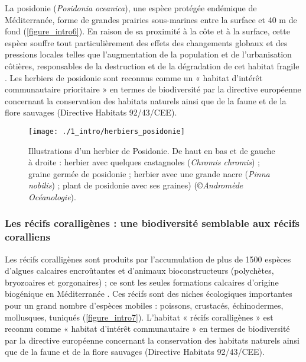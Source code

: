 La posidonie (\textit{Posidonia oceanica}), une espèce protégée endémique de Méditerranée, forme de grandes prairies sous-marines entre la surface et 40 m de fond (\autoref{figure_intro6}). En raison de sa proximité à la côte et à la surface, cette espèce souffre tout particulièrement des effets des changements globaux \citep{marba_mediterranean_2014} et des pressions locales telles que l’augmentation de la population et de l’urbanisation côtières, responsables de la destruction et de la dégradation de cet habitat fragile \citep{montefalcone_human_2010, marba_mediterranean_2014, holon_impact_2015, telesca_seagrass_2015}. Les herbiers de posidonie sont reconnus comme un « habitat d’intérêt communautaire prioritaire » en termes de biodiversité par la directive européenne concernant la conservation des habitats naturels ainsi que de la faune et de la flore sauvages (Directive Habitats 92/43/CEE).

\begin{figure}[H]
	\begin{center}
	\texttt{[image: ./1\_intro/herbiers\_posidonie]}
		\caption[Illustrations d’un herbier de Posidonie]{Illustrations d’un herbier de Posidonie. De haut en bas et de gauche à droite : herbier avec quelques castagnoles (\textit{Chromis chromis}) ; graine germée de posidonie ; herbier avec une grande nacre (\textit{Pinna nobilis}) ; plant de posidonie avec ses graines) (\textit{©Andromède Océanologie}).}
	\label{figure_intro6}
\end{center}
\end{figure}

\subsubsection{Les récifs coralligènes : une biodiversité semblable aux récifs coralliens}\label{intro.1.3.2}

Les récifs coralligènes sont produits par l’accumulation de plus de 1500 espèces d’algues calcaires encroûtantes et d’animaux bioconstructeurs (polychètes, bryozoaires et gorgonaires) \citep{ballesteros_mediterranean_2006}; ce sont les seules formations calcaires d’origine biogénique en Méditerranée \citep{ballesteros_mediterranean_2006}. Ces récifs sont des niches écologiques importantes pour un grand nombre d’espèces mobiles : poissons, crustacés, échinodermes, mollusques, tuniqués \citep{ballesteros_mediterranean_2006} (\autoref{figure_intro7}). L'habitat « récifs coralligènes » est reconnu comme « habitat d’intérêt communautaire » en termes de biodiversité par la directive européenne concernant la conservation des habitats naturels ainsi que de la faune et de la flore sauvages (Directive Habitats 92/43/CEE).

